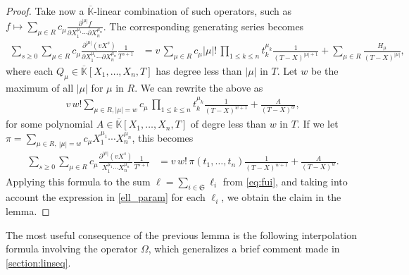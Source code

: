\documentclass[12pt]{article}
\newcommand{\lf}{X}
\newcommand{\sqfree}{Q}
\def\Kbar {{\ensuremath{\overline{\mathbb{K}}}}}
\begin{document}
\begin{proof}
  Take now a $\Kbar$-linear combination of such operators, such as $f \mapsto
  \sum_{\mu \in R} c_\mu \frac{ \partial^{|\mu|} f } {\partial
    X_1^{\mu_1} \cdots \partial X_n^{\mu_n}}$. The corresponding
  generating series becomes
  \begin{align*}
    \sum_{s \ge 0} \sum_{\mu \in R} c_\mu \frac{ \partial^{|\mu|} ( v
      \lf^s )} {\partial X_1^{\mu_1} \cdots \partial X_n^{\mu_n}}
    \frac{1}{T^{s+1}} &= v\,\sum_{\mu \in R} c_\mu |\mu|!\, \prod_{1
      \le k \le n} t_k^{\mu_k} \frac {1}{(T-\lf )^{|\mu|+1}} +\sum_{\mu
      \in R} \frac{H_\mu}{(T-\lf)^{|\mu|}},
  \end{align*}
  where each $\sqfree_\mu \in \Kbar[X_1,\dots,X_n,T]$ has degree less than
  $|\mu|$ in $T$.  Let $w$ be the maximum of all $|\mu|$ for $\mu$ in
  $R$. We can rewrite the above as
  \begin{align*}
    v\, w! 
    \sum_{\mu \in R, |\mu|=w} c_\mu
    \, \prod_{1 \le k \le n} 
    t_k^{\mu_k}
    \frac {1}{(T-\lf )^{w+1}}
	+ \frac{A}{(T-\lf )^{w}},
  \end{align*}
  for some polynomial $A \in \Kbar[X_1,\dots,X_n,T]$ of degre less than $w$ in $T$. If we let 
  $\pi =\sum_{\mu \in R,\ |\mu|=w} c_{\mu} X_1^{\mu_1} \cdots
  X_n^{\mu_n}$, this becomes
  \begin{align*}
    \sum_{s \ge 0} 
    \sum_{\mu \in R} c_\mu \frac{ \partial^{|\mu|} ( v \lf^s )} { X_1^{\mu_1} \cdots
      X_n^{\mu_n}}
    \frac{1}{T^{s+1}} 
    &=
    v\, w! \,  \pi(t_1,\dots,t_n)
    \frac {1}{(T-\lf )^{w+1}}
    + \frac{A}{(T-\lf )^{w}}.
  \end{align*}
  Applying this formula to the sum $\ell=\sum_{i \in
    \mathfrak{S}}\ell_i$ from \cref{eq:fui}, and taking into account
  the expression in \cref{ell_param} for each $\ell_i$, we obtain the
  claim in the lemma.
\end{proof}

\noindent 
The most useful consequence of the previous lemma is the following
interpolation formula involving the operator $\Omega$, which
generalizes a brief comment made in \cref{section:linseq}.
\end{document}
